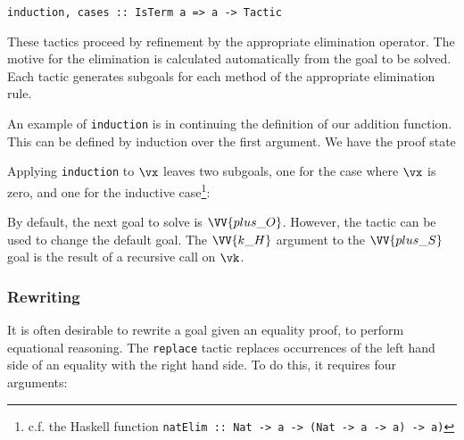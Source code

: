 \begin{verbatim}
induction, cases :: IsTerm a => a -> Tactic
\end{verbatim}

These tactics proceed by refinement by the appropriate elimination
operator. The motive for the elimination is calculated automatically
from the goal to be solved. Each tactic generates subgoals for each
method of the appropriate elimination rule.




An example of \texttt{induction} is in continuing the definition of
our addition function. This can be defined by induction over the first
argument. We have the proof state


Applying \texttt{induction} to $\vx$ leaves two subgoals, one for the
case where $\vx$ is zero, and one for the inductive
case\footnote{c.f. the Haskell function \texttt{natElim
    :: Nat -> a -> (Nat -> a -> a) -> a)}}:


By default, the next goal to solve is $\VV{plus\_O}$. However, the
 tactic can be used to change the default goal.
The $\VV{k\_H}$ argument to the $\VV{plus\_S}$ goal is the result of a
recursive call on $\vk$.

\subsubsection{Rewriting}
It is often desirable to rewrite a goal given an equality proof, to
perform equational reasoning. The \texttt{replace} tactic replaces
occurrences of the left hand side of an equality with the right hand
side. To do this, it requires four arguments:

